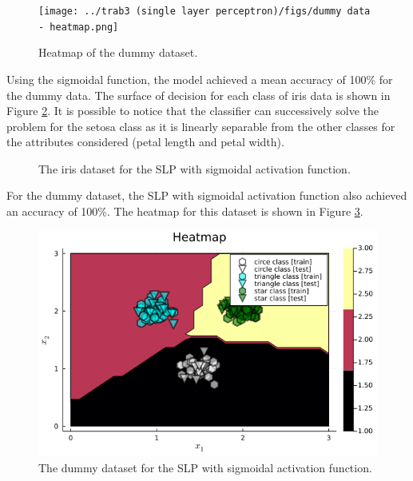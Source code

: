 \documentclass[12pt,a4paper]{article}
\begin{document}
\begin{figure}[H]
    \centering
    \texttt{[image: ../trab3 (single layer perceptron)/figs/dummy data - heatmap.png]}
    \caption{Heatmap of the dummy dataset.}
    \label{fig:heatmap-dummy-dataset}
\end{figure}

Using the sigmoidal function, the model achieved a mean accuracy of 100\% for the dummy data. The surface of decision for each class of iris data is shown in Figure \ref{fig:iris-decision-surface}. It is possible to notice that the classifier can successively solve the problem for the setosa class as it is linearly separable from the other classes for the attributes considered (petal length and petal width).

\begin{figure}[H]
    \centering
    

    
    \caption{The iris dataset for the SLP with sigmoidal activation function.}
    \label{fig:iris-decision-surface}
    
\end{figure}

For the dummy dataset, the SLP with sigmoidal activation function also achieved an accuracy of 100\%. The heatmap for this dataset is shown in Figure \ref{fig:dummy-data-heatmap}.

\begin{figure}[H]
    \centering
    \includegraphics[scale=0.4]{../trab4 (single layer perceptron with sigmoidal functions)/figs/dummy data - heatmap.png}%
    
    \caption{The dummy dataset for the SLP with sigmoidal activation function.}
    \label{fig:dummy-data-heatmap}
\end{figure}
\end{document}
